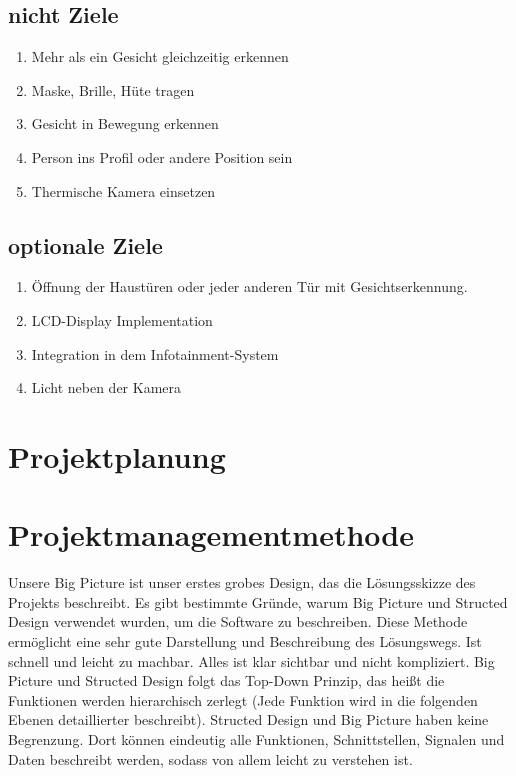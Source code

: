 \subsection{nicht Ziele}
\begin{enumerate}
	\item Mehr als ein Gesicht gleichzeitig erkennen
	
	\item Maske, Brille, Hüte tragen 
	
	\item Gesicht in Bewegung erkennen 
	
	\item Person ins Profil oder andere Position sein
	
	\item Thermische Kamera einsetzen
	
	
\end{enumerate}
\subsection{optionale Ziele}
\begin{enumerate}
	
	
	\item Öffnung der Haustüren oder jeder anderen Tür mit Gesichtserkennung.
	
	\item LCD-Display Implementation
	
	\item Integration in dem Infotainment-System
	
	\item Licht neben der Kamera 
\end{enumerate}
\section{Projektplanung}


\section{Projektmanagementmethode}


Unsere Big Picture ist unser erstes grobes Design, das die Lösungsskizze des Projekts beschreibt. Es gibt bestimmte Gründe, warum Big Picture und Structed Design verwendet wurden, um die Software zu beschreiben. Diese Methode ermöglicht eine sehr gute Darstellung und Beschreibung des Lösungswegs. Ist schnell und leicht zu machbar. Alles ist klar sichtbar und nicht kompliziert. Big Picture und Structed Design folgt das Top-Down Prinzip, das heißt die Funktionen werden hierarchisch zerlegt (Jede Funktion wird in die folgenden Ebenen detaillierter beschreibt). Structed Design und Big Picture haben keine Begrenzung. Dort können eindeutig alle Funktionen, Schnittstellen, Signalen und Daten beschreibt werden, sodass von allem leicht zu verstehen ist. 


